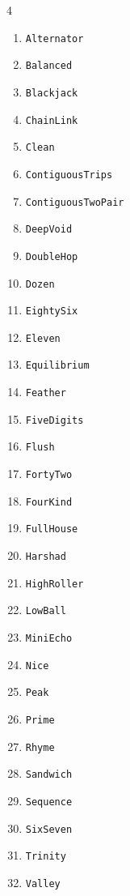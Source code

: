 \begin{multicols}4
    \begin{enumerate}
        \item \texttt{Alternator}
        \item \texttt{Balanced}
        \item \texttt{Blackjack}
        \item \texttt{ChainLink}
        \item \texttt{Clean}
        \item \texttt{ContiguousTrips}
        \item {\footnotesize\texttt{ContiguousTwoPair}}\vphantom{a}
        \item \texttt{DeepVoid}
        \item \texttt{DoubleHop}
        \item \texttt{Dozen}
        \item \texttt{EightySix}
        \item \texttt{Eleven}
        \item \texttt{Equilibrium}
        \item \texttt{Feather}
        \item \texttt{FiveDigits}
        \item \texttt{Flush}
        \item \texttt{FortyTwo}
        \item \texttt{FourKind}
        \item \texttt{FullHouse}
        \item \texttt{Harshad}
        \item \texttt{HighRoller}
        \item \texttt{LowBall}
        \item \texttt{MiniEcho}
        \item \texttt{Nice}
        \item \texttt{Peak}
        \item \texttt{Prime}
        \item \texttt{Rhyme}
        \item \texttt{Sandwich}
        \item \texttt{Sequence}
        \item \texttt{SixSeven}
        \item \texttt{Trinity}
        \item \texttt{Valley}
    \end{enumerate}
\end{multicols}

